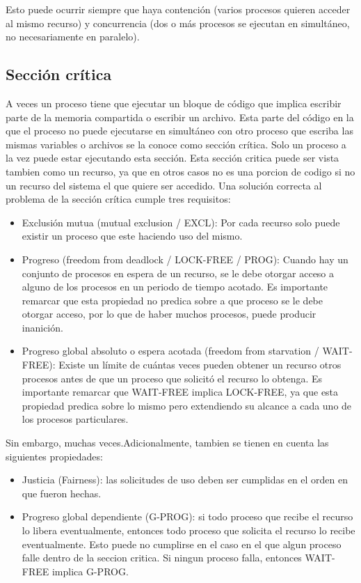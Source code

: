 \documentclass{article}
\begin{document}
Esto puede ocurrir siempre que haya contenci\'on (varios procesos quieren acceder al mismo recurso) y concurrencia (dos o m\'as procesos se ejecutan en simult\'aneo, no necesariamente en paralelo).

\subsection{Secci\'on cr\'itica}

A veces un proceso tiene que ejecutar un bloque de c\'odigo que implica escribir parte de la memoria compartida o escribir un archivo. Esta parte del c\'odigo en la que el proceso no puede ejecutarse en simult\'aneo con otro proceso que escriba las mismas variables o archivos se la conoce como secci\'on cr\'itica. Solo un proceso a la vez puede estar ejecutando esta sección. Esta sección critica puede ser vista tambien como un recurso, ya que en otros casos no es una porcion de codigo si no un recurso del sistema el que quiere ser accedido. Una soluci\'on correcta al problema de la secci\'on cr\'itica cumple tres requisitos:

\begin{itemize}
\item Exclusión mutua (mutual exclusion / EXCL): Por cada recurso solo puede existir un proceso que este haciendo uso del mismo.
\item Progreso (freedom from deadlock / LOCK-FREE / PROG): Cuando hay un conjunto de procesos en espera de un recurso, se le debe otorgar acceso a alguno de los procesos en un periodo de tiempo acotado. Es importante remarcar que esta propiedad no predica sobre a que proceso se le debe otorgar acceso, por lo que de haber muchos procesos, puede producir inanición.
\item Progreso global absoluto o espera acotada (freedom from starvation / WAIT-FREE): Existe un l\'imite de cu\'antas veces pueden obtener un recurso otros procesos antes de que un proceso que solicitó el recurso lo obtenga. Es importante remarcar que WAIT-FREE implica LOCK-FREE, ya que esta propiedad predica sobre lo mismo pero extendiendo su alcance a cada uno de los procesos particulares.
\end{itemize}



Sin embargo, muchas veces.Adicionalmente, tambien se tienen en cuenta las siguientes propiedades:
\begin{itemize}
 \item Justicia (Fairness): las solicitudes de uso deben ser cumplidas en el orden en que fueron hechas.
 \item Progreso global dependiente (G-PROG): si todo proceso que recibe el recurso lo libera eventualmente, entonces todo proceso que solicita el recurso lo recibe eventualmente. Esto puede no cumplirse en el caso en el que algun proceso falle dentro de la seccion critica. Si ningun proceso falla, entonces WAIT-FREE implica G-PROG.
\end{itemize}
\end{document}
